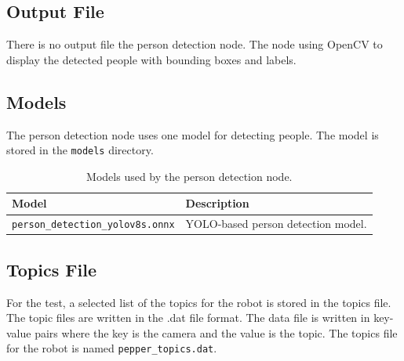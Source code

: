 \documentclass{CSSRforAfrica}
\begin{document}
\subsection*{Output File}
There is no output file the person detection node. The node using OpenCV to display the detected people with bounding boxes and labels.

\subsection*{Models}
The person detection node uses one model for detecting people. The model is stored in the \texttt{models} directory.
\begin{table}[h!]
	\centering
	\begin{tabularx}{\linewidth}{| l | X |}
		\hline
		\rowcolor{blue!20} %
		\textbf{Model} & \textbf{Description} \\
		\hline
		{\footnotesize \texttt{person\_detection\_yolov8s.onnx} }  & {\footnotesize YOLO-based person detection model.} \\
		\hline
	\end{tabularx}
	\caption{Models used by the person detection node.}
\end{table}

\subsection*{Topics File} 
For the test, a selected list of the topics for the robot is stored in the topics file. The topic files are 
written in the .dat file format. The data file is written in key-value pairs where the key is the camera 
and the value is the topic. The topics file for the robot is named \texttt{pepper\_topics.dat}.
\end{document}
